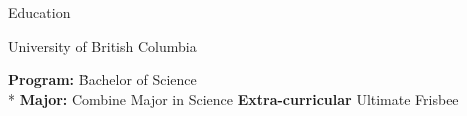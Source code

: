 \documentclass{article}
\newlength{\tabin}
\newlength{\secsep}
\newcommand{\lineunder}{\vspace*{-8pt} \\ \hspace*{-6pt} \hrulefill \\ \vspace*{-15pt}}
\newenvironment{tabbedsection}[1]{
  \begin{list}{}{
      \setlength{\itemsep}{0pt}
      \setlength{\labelsep}{0pt}
      \setlength{\labelwidth}{0pt}
      \setlength{\leftmargin}{\tabin}
      \setlength{\rightmargin}{\tabin}
      \setlength{\listparindent}{0pt}
      \setlength{\parsep}{0pt}
      \setlength{\parskip}{0pt}
      \setlength{\partopsep}{0pt}
      \setlength{\topsep}{#1}
    }
  \item[]
}{\end{list}}
\newenvironment{nospacetabbing}{
    \begin{tabbing}
}{\end{tabbing}\vspace{-1.2em}}
\newenvironment{resume_section}[1]{
  \filbreak
  \vspace{2\secsep}
  \textsc{\large#1}
  \lineunder
  \begin{tabbedsection}{\secsep}
}{\end{tabbedsection}}
\newenvironment{resume_subsection}[2][]{
  \textbf{#2} \hfill {\footnotesize #1} \hspace{-5.1em}
  \begin{tabbedsection}{0.5\secsep}
}{\end{tabbedsection}}
\begin{document}
%
\begin{resume_section}{Education}
  \begin{resume_subsection}[09/2023 - Present]{University of British Columbia}
    \begin{nospacetabbing}
      \textbf{Program:} \= Bachelor of Science\\*
      \textbf{Major:} \> Combine Major in Science
      \textbf{Extra-curricular} \> Ultimate Frisbee
    \end{nospacetabbing}
  \end{resume_subsection}
\end{resume_section}




  
\end{document}
